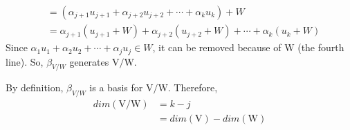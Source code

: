 \documentclass[11pt]{scrartcl}
\begin{document}
\begin{enumerate}[label=\alph*.]
\begin{enumerate}[label=\roman*.]
{\begin{align*}
				              & = (\alpha_{j+1}u_{j+1} + \alpha_{j+2}u_{j+2} + \cdots + \alpha_{k}u_{k}) + W                                                         \\
				              & = \alpha_{j+1}(u_{j+1} + W) + \alpha_{j+2}(u_{j+2} + W) + \cdots + \alpha_{k}(u_{k} + W)
			            \end{align*}
			            }
			            Since $\alpha_1u_1 + \alpha_2u_2 + \cdots + \alpha_ju_j \in W$, it can be removed
			            because of $\mathrm{W}$ (the fourth line). So, $\beta_{V/W}$ generates $\mathrm{V}/\mathrm{W}$.
		      \end{enumerate}
		      By definition, $\beta_{V/W}$ is a basis for $\mathrm{V}/\mathrm{W}$.
		      Therefore,
		      \begin{align*}
			      dim(\mathrm{V}/\mathrm{W}) & =  k - j                            \\
			                                 & = dim(\mathrm{V}) - dim(\mathrm{W})
		      \end{align*}
	      \fi




\end{enumerate}
\end{document}
